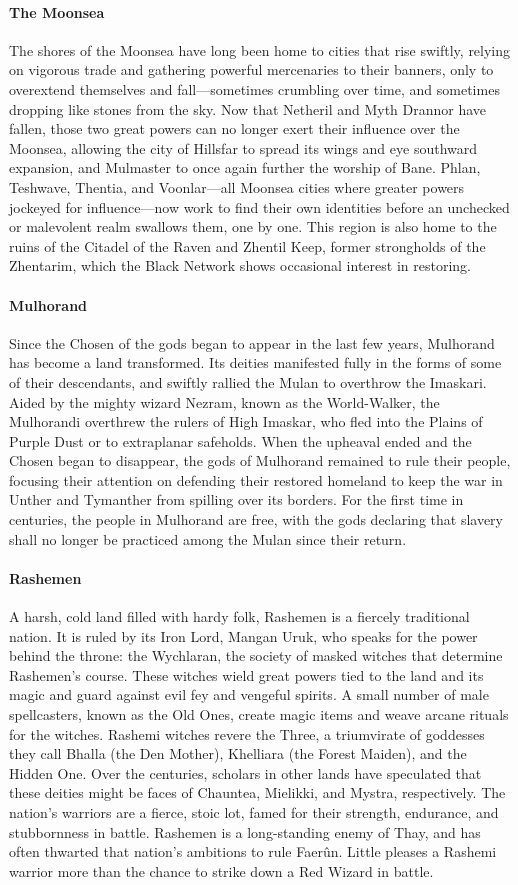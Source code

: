 \documentclass[10pt,a4paper,twoside,twocolumn,openany,bg=print,nodeprecatedcode]{dndbook}
\begin{document}
\paragraph{The Moonsea}
The shores of the Moonsea have long been home to cities that rise swiftly, relying on vigorous trade and gathering powerful mercenaries to their banners, only to overextend themselves and fall—sometimes crumbling over time, and sometimes dropping like stones from the sky.
Now that Netheril and Myth Drannor have fallen, those two great powers can no longer exert their influence over the Moonsea, allowing the city of Hillsfar to spread its wings and eye southward expansion, and Mulmaster to once again further the worship of Bane. Phlan, Teshwave, Thentia, and Voonlar—all Moonsea cities where greater powers jockeyed for influence—now work to find their own identities before an unchecked or malevolent realm swallows them, one by one.
This region is also home to the ruins of the Citadel of the Raven and Zhentil Keep, former strongholds of the Zhentarim, which the Black Network shows occasional interest in restoring.
\paragraph{Mulhorand}
Since the Chosen of the gods began to appear in the last few years, Mulhorand has become a land transformed. Its deities manifested fully in the forms of some of their descendants, and swiftly rallied the Mulan to overthrow the Imaskari. Aided by the mighty wizard Nezram, known as the World-Walker, the Mulhorandi overthrew the rulers of High Imaskar, who fled into the Plains of Purple Dust or to extraplanar safeholds.
When the upheaval ended and the Chosen began to disappear, the gods of Mulhorand remained to rule their people, focusing their attention on defending their restored homeland to keep the war in Unther and Tymanther from spilling over its borders. For the first time in centuries, the people in Mulhorand are free, with the gods declaring that slavery shall no longer be practiced among the Mulan since their return.
\paragraph{Rashemen}
A harsh, cold land filled with hardy folk, Rashemen is a fiercely traditional nation. It is ruled by its Iron Lord, Mangan Uruk, who speaks for the power behind the throne: the Wychlaran, the society of masked witches that determine Rashemen's course. These witches wield great powers tied to the land and its magic and guard against evil fey and vengeful spirits. A small number of male spellcasters, known as the Old Ones, create magic items and weave arcane rituals for the witches. Rashemi witches revere the Three, a triumvirate of goddesses they call Bhalla (the Den Mother), Khelliara (the Forest Maiden), and the Hidden One. Over the centuries, scholars in other lands have speculated that these deities might be faces of Chauntea, Mielikki, and Mystra, respectively.
The nation's warriors are a fierce, stoic lot, famed for their strength, endurance, and stubbornness in battle. Rashemen is a long-standing enemy of Thay, and has often thwarted that nation's ambitions to rule Faerûn. Little pleases a Rashemi warrior more than the chance to strike down a Red Wizard in battle.
\end{document}
